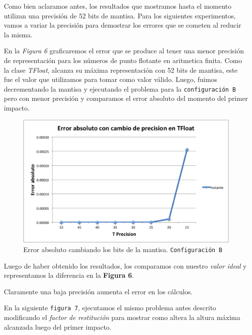 \documentclass[a4paper]{article}
\begin{document}
Como bien aclaramos antes, los resultados que mostramos hasta el momento utilizan una precisión de 52 bits de mantisa. Para los siguientes experimentos, vamos a variar la precisión para demostrar los errores que se cometen al reducir la misma.



En la \textit{Figura 6} graficaremos el error que se produce al tener una menor precisión de representación para los números de punto flotante en aritmetica finita. 
Como la clase \textit{TFloat}, alcanza su máxima representación con 52 bits de mantisa, este fue el valor que utilizamos para tomar como valor válido. Luego, fuimos decrementando la mantisa y ejecutando el problema para la \texttt{configuración B} pero con menor precisión y comparamos el error absoluto del momento del primer impacto. \\[1em]

\begin{figure}[H]
  \centering
  \includegraphics[scale=0.75]{graficos/6-errorAbsoluto.png}
  \caption{Error absoluto cambiando los bits de la mantisa. \texttt{Configuración B} }
\end{figure}

Luego de haber obtenido los resultados, los comparamos con nuestro \textit{valor ideal} y representamos la diferencia en la \textbf{Figura 6}.

Claramente una baja precisión aumenta el error en los cálculos.


En la siguiente \texttt{figura 7}, ejecutamos el mismo problema antes descrito modificando el \textit{factor de restitución} para mostrar como altera la altura máxima alcanzada luego del primer impacto.
\end{document}
